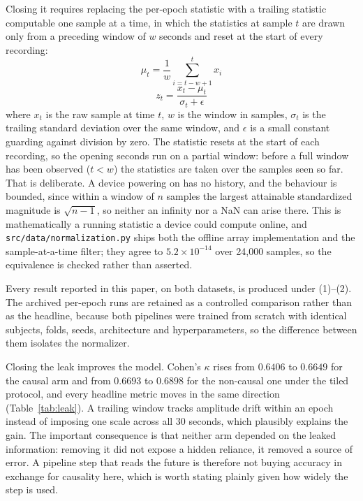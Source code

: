 \documentclass[conference]{IEEEtran}
\begin{document}
Closing it requires replacing the per-epoch statistic with a trailing statistic computable one
sample at a time, in which the statistics at sample $t$ are drawn only from a preceding window of
$w$ seconds and reset at the start of every recording:
\begin{equation}
\mu_t = \frac{1}{w}\sum_{i=t-w+1}^{t} x_i
\end{equation}
\begin{equation}
z_t = \frac{x_t - \mu_t}{\sigma_t + \epsilon}
\end{equation}
where $x_t$ is the raw sample at time $t$, $w$ is the window in samples, $\sigma_t$ is the trailing
standard deviation over the same window, and $\epsilon$ is a small constant guarding against
division by zero. The statistic resets at the start of each recording, so the opening seconds run
on a partial window: before a full window has been observed ($t < w$) the statistics are taken over
the samples seen so far. That is deliberate. A device powering on has no history, and the behaviour
is bounded, since within a window of $n$ samples the largest attainable standardized magnitude is
$\sqrt{n-1}$, so neither an infinity nor a NaN can arise there. This is mathematically a running
statistic a device could compute online, and \texttt{src/data/normalization.py} ships both the
offline array implementation and the sample-at-a-time filter; they agree to $5.2\times10^{-14}$
over 24{,}000 samples, so the equivalence is checked rather than asserted.

Every result reported in this paper, on both datasets, is produced under (1)--(2). The archived
per-epoch runs are retained as a controlled comparison rather than as the headline, because both
pipelines were trained from scratch with identical subjects, folds, seeds, architecture and
hyperparameters, so the difference between them isolates the normalizer.

Closing the leak improves the model. Cohen's $\kappa$ rises from $0.6406$ to $0.6649$ for the
causal arm and from $0.6693$ to $0.6898$ for the non-causal one under the tiled protocol, and every
headline metric moves in the same direction (Table~\ref{tab:leak}). A trailing window tracks
amplitude drift within an epoch instead of imposing one scale across all 30 seconds, which
plausibly explains the gain. The important consequence is that neither arm depended on the leaked
information: removing it did not expose a hidden reliance, it removed a source of error. A pipeline
step that reads the future is therefore not buying accuracy in exchange for causality here, which
is worth stating plainly given how widely the step is used.
\end{document}
